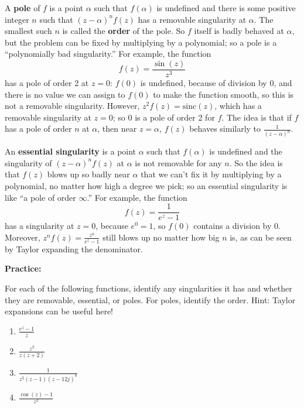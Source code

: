 \documentclass{article}
\newcommand{\sinc}{\mathrm{sinc}}
\begin{document}
A \textbf{pole} of $f$ is a point $\alpha$ such that $f(\alpha)$ is undefined and there is some positive integer $n$ such that $(z-\alpha)^nf(z)$ has a removable singularity at $\alpha$. The smallest such $n$ is called the \textbf{order} of the pole. So $f$ itself is badly behaved at $\alpha$, but the problem can be fixed by multiplying by a polynomial; so a pole is a ``polynomially bad singularity.'' For example, the function
	\[f(z)=\frac{\sin(z)}{z^3}\]
has a pole of order 2 at $z=0$: $f(0)$ is undefined, because of division by 0, and there is no value we can assign to $f(0)$ to make the function smooth, so this is not a removable singularity. However, $z^2f(z)=\sinc(z)$, which has a removable singularity at $z=0$; so $0$ is a pole of order 2 for $f$. The idea is that if $f$ has a pole of order $n$ at $\alpha$, then near $z=\alpha$, $f(z)$ behaves similarly to $\frac{1}{(z-\alpha)^n}$.

An \textbf{essential singularity} is a point $\alpha$ such that $f(\alpha)$ is undefined and the singularity of $(z-\alpha)^nf(z)$ at $\alpha$ is not removable for any $n$. So the idea is that $f(z)$ blows up so badly near $\alpha$ that we can't fix it by multiplying by a polynomial, no matter how high a degree we pick; so an essential singularity is like ``a pole of order $\infty$.'' For example, the function
	\[f(z)=\frac{1}{e^z-1}\]
has a singularity at $z=0$, because $e^0=1$, so $f(0)$ contains a division by 0. Moreover, $z^nf(z)=\frac{z^n}{e^z-1}$ still blows up no matter how big $n$ is, as can be seen by Taylor expanding the denominator.




\clearpage



\textbf{Practice:}\bigskip


For each of the following functions, identify any singularities it has and whether they are removable, essential, or poles. For poles, identify the order. Hint: Taylor expansions can be useful here!

\begin{enumerate}
	\item $\frac{e^z-1}{z}$
	\item $\frac{z^2}{z(z+2)}$
	\item $\frac{1}{z^2(z-1)(z-12j)^8}$
	\item $\frac{\cos(z)-1}{z^2}$
\end{enumerate}


\clearpage
\end{document}
